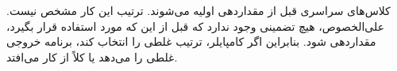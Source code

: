 \section{}
\paragraph{}\label{answer:3}
کلاس‌های سراسری قبل از  مقداردهی اولیه می‌شوند. ترتیب این کار مشخص نیست. علی‌الخصوص، هیچ تضمینی وجود ندارد که  قبل از این که مورد استفاده قرار بگیرد، مقداردهی شود. بنابراین اگر کامپایلر، ترتیب غلطی را انتخاب کند، برنامه خروجی غلطی را می‌دهد یا کلاً از کار می‌افتد.